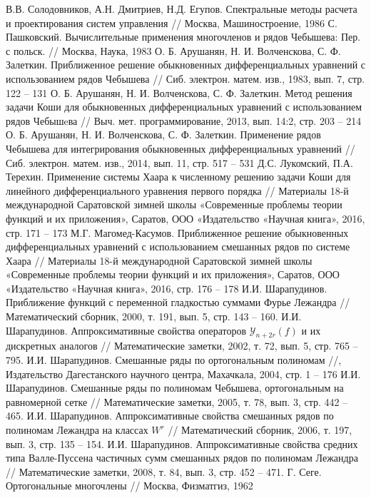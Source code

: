\begin{thebibliography}{1}
  В.В. Солодовников, А.Н. Дмитриев, Н.Д. Егупов. Спектральные методы расчета и проектирования систем управления // Москва, Машиностроение, 1986
 С. Пашковский. Вычислительные применения многочленов и рядов Чебышева: Пер. с польск. // Москва, Наука, 1983
  О. Б. Арушанян, Н. И. Волченскова, С. Ф. Залеткин. Приближенное решение обыкновенных дифференциальных уравнений с использованием рядов Чебышева // Сиб. электрон. матем. изв., 1983, вып. 7, стр. 122 – 131
  О. Б. Арушанян, Н. И. Волченскова, С. Ф. Залеткин. Метод решения задачи Коши для обыкновенных дифференциальных уравнений с использованием рядов Чебышeва // Выч. мет. программирование, 2013, вып. 14:2, стр. 203 – 214
  О. Б. Арушанян, Н. И. Волченскова, С. Ф. Залеткин. Применение рядов Чебышева для интегрирования обыкновенных дифференциальных уравнений // Сиб. электрон. матем. изв., 2014, вып. 11, стр. 517 – 531
  Д.С. Лукомский, П.А. Терехин. Применение системы Хаара к численному решению задачи Коши для линейного дифференциального уравнения первого порядка // Материалы 18-й международной Саратовской зимней школы «Современные проблемы теории функций и их приложения», Саратов, ООО «Издательство «Научная книга», 2016, стр. 171 – 173
  М.Г. Магомед-Касумов. Приближенное решение обыкновенных дифференциальных уравнений с использованием смешанных рядов по системе Хаара // Материалы 18-й международной Саратовской зимней школы «Современные проблемы теории функций и их приложения», Саратов, ООО «Издательство «Научная книга», 2016, стр. 176 – 178
  И.И. Шарапудинов. Приближение функций с переменной гладкостью суммами Фурье Лежандра // Математический сборник, 2000, т. 191, вып. 5, стр. 143 – 160.
  И.И. Шарапудинов. Аппроксимативные свойства операторов $\mathcal{Y}_{n+2r}(f)$ и их дискретных аналогов // Математические заметки, 2002, т. 72, вып. 5, стр. 765 – 795.
  И.И. Шарапудинов. Смешанные ряды по ортогональным полиномам //, Издательство Дагестанского научного центра, Махачкала, 2004, стр. 1 – 176
  И.И. Шарапудинов. Смешанные ряды по полиномам Чебышева, ортогональным на равномерной сетке // Математические заметки, 2005, т. 78, вып. 3, стр. 442 – 465.
  И.И. Шарапудинов. Аппроксимативные свойства смешанных рядов по полиномам Лежандра на классах $W^r$ // Математический сборник, 2006, т. 197, вып. 3, стр. 135 – 154.
  И.И. Шарапудинов. Аппроксимативные свойства средних типа Валле-Пуссена частичных сумм смешанных рядов по полиномам Лежандра // Математические заметки, 2008, т. 84, вып. 3, стр. 452 – 471.
 Г. Сеге. Ортогональные многочлены // Москва, Физматгиз, 1962



\end{thebibliography}
